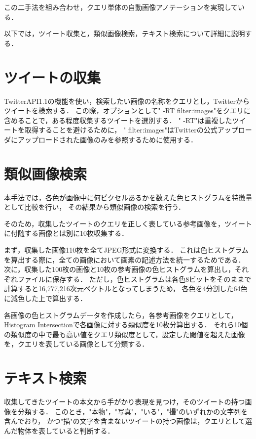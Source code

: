 この二手法を組み合わせ，クエリ単体の自動画像アノテーションを実現している．

以下では，ツイート収集と，類似画像検索，テキスト検索について詳細に説明する．

\section{ツイートの収集}
TwitterAPI1.1の機能を使い，検索したい画像の名称をクエリとし，Twitterからツイートを検索する．
この際，オプションとして" -RT filter:images"をクエリに含めることで，ある程度収集するツイートを選別する．
" -RT"は重複したツイートを取得することを避けるために，
" filter:images"はTwitterの公式アップローダにアップロードされた画像のみを参照するために使用する．

\section{類似画像検索}
本手法では，各色が画像中に何ピクセルあるかを数えた色ヒストグラムを特徴量として比較を行い，
その結果から類似画像の検索を行う．

そのため，収集したツイートのクエリを正しく表している参考画像を，ツイートに付随する画像とは別に10枚収集する．

まず，収集した画像110枚を全てJPEG形式に変換する．
これは色ヒストグラムを算出する際に，全ての画像において画素の記述方法を統一するためである．
次に，収集した100枚の画像と10枚の参考画像の色ヒストグラムを算出し，それぞれファイルに保存する．
ただし，色ヒストグラムは各色8ビットをそのままで計算すると16,777,216次元ベクトルとなってしまうため，
各色を4分割した64色に減色した上で算出する．

各画像の色ヒストグラムデータを作成したら，各参考画像をクエリとして，
Histogram Intersectionで各画像に対する類似度を10枚分算出する．
それら10個の類似度の中で最も高い値をクエリ類似度として，設定した閾値を超えた画像を，クエリを表している画像として分類する．
\section{テキスト検索}
収集してきたツイートの本文から手がかり表現を見つけ，そのツイートの持つ画像を分類する．
このとき，"本物"，"写真"，"いる"，"撮"のいずれかの文字列を含んでおり，
かつ"描"の文字を含まないツイートの持つ画像は，クエリとして選んだ物体を表していると判断する．

